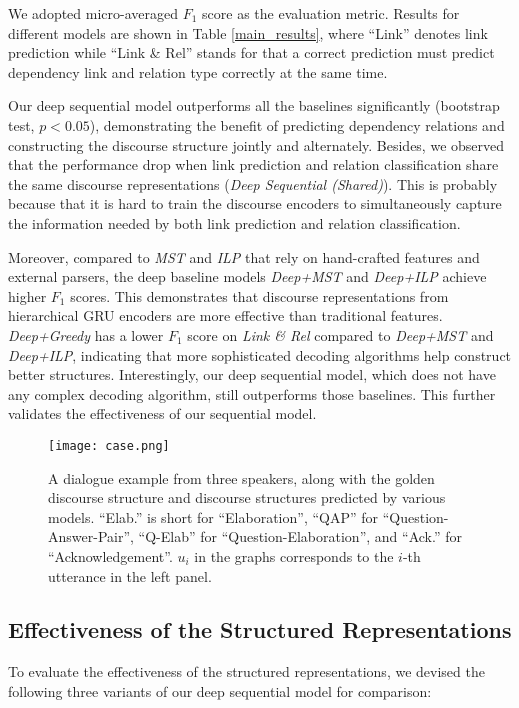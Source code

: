 \documentclass[letterpaper]{article} \usepackage{aaai19}  \usepackage{times}  \usepackage{helvet}  \usepackage{courier}  \usepackage{url}  \usepackage{graphicx}  \usepackage{amssymb}
\begin{document}
We adopted micro-averaged $F_1$ score as the evaluation metric.
Results for different models are shown in Table \ref{main_results}, where ``Link'' denotes link prediction while ``Link \& Rel'' stands for that a correct prediction must predict dependency link and relation type correctly at the same time.

Our deep sequential model outperforms all the baselines significantly (bootstrap test, $p<0.05$), demonstrating the benefit of predicting dependency relations and constructing the discourse structure jointly and alternately.
Besides, we observed that the performance drop when link prediction and relation classification share the same discourse representations (\emph{Deep Sequential (Shared)}).
This is probably because that it is hard to train the discourse encoders to simultaneously capture the information needed by both link prediction and relation classification.

Moreover, compared to \emph{MST} and \emph{ILP} that rely on hand-crafted features and external parsers, the deep baseline models \emph{Deep+MST} and \emph{Deep+ILP} achieve higher $F_1$ scores. This demonstrates that discourse representations from hierarchical GRU encoders are more effective than traditional features.
\emph{Deep+Greedy} has a lower $F_1$ score on \emph{Link \& Rel} compared to \emph{Deep+MST} and \emph{Deep+ILP}, indicating that more sophisticated decoding algorithms help construct better structures. Interestingly, our deep sequential model, which does not have any complex decoding algorithm, still outperforms those baselines. This further validates the effectiveness of our sequential model.

\begin{figure*}[ht]
    \centering
    \texttt{[image: case.png]}  
    \caption{A dialogue example from three speakers, along with the golden discourse structure and discourse structures predicted by various models. ``Elab.'' is short for ``Elaboration'', ``QAP'' for ``Question-Answer-Pair'', ``Q-Elab'' for ``Question-Elaboration'', and ``Ack.'' for ``Acknowledgement''. $u_i$ in the graphs corresponds to the $i$-th utterance in the left panel.}
    \label{case}
\end{figure*}

\subsection{Effectiveness of the Structured Representations}

To evaluate the effectiveness of the structured representations, we devised the following three variants of our deep sequential model for comparison:
\end{document}
